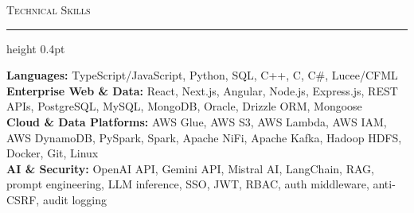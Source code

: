 \documentclass[letterpaper,11pt]{article}
\newcommand{\resumesection}[1]{%
  \par\vspace{2pt}%
  {\large\scshape #1}\par\vspace{2pt}%
  \hrule height 0.4pt\vspace{2pt}%
}
\begin{document}
\resumesection{Technical Skills}
\textbf{Languages:} TypeScript/JavaScript, Python, SQL, C++, C, C\#, Lucee/CFML\\
\textbf{Enterprise Web \& Data:} React, Next.js, Angular, Node.js, Express.js, REST APIs, PostgreSQL, MySQL, MongoDB, Oracle, Drizzle ORM, Mongoose\\
\textbf{Cloud \& Data Platforms:} AWS Glue, AWS S3, AWS Lambda, AWS IAM, AWS DynamoDB, PySpark, Spark, Apache NiFi, Apache Kafka, Hadoop HDFS, Docker, Git, Linux\\
\textbf{AI \& Security:} OpenAI API, Gemini API, Mistral AI, LangChain, RAG, prompt engineering, LLM inference, SSO, JWT, RBAC, auth middleware, anti-CSRF, audit logging
\end{document}
